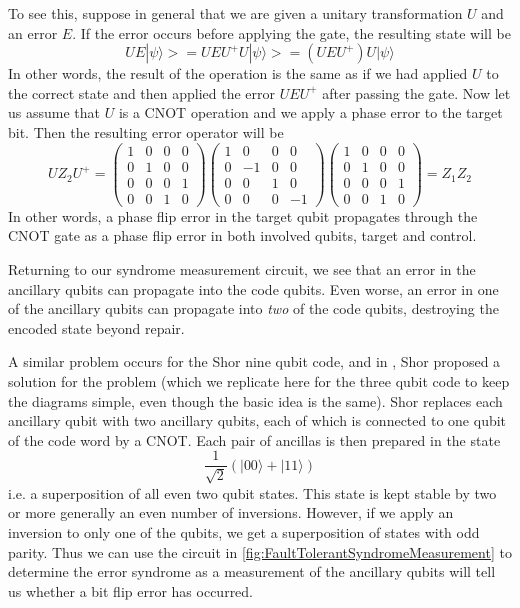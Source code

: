 \documentclass[a4paper, draft]{article}
\theoremstyle{own}
\theoremstyle{remark}
\begin{document}
To see this, suppose in general that we are given a unitary transformation $U$ and an error $E$. If the error occurs before applying the gate, the resulting state will be
$$
UE |\psi \rangle > = UEU^+ U |\psi \rangle > = (UEU^+) U |\psi \rangle
$$
In other words, the result of the operation is the same as if we had applied $U$ to the correct state and then applied the error $U E U^+$ after passing the gate. Now let us assume that $U$ is a CNOT operation and we apply a phase error to the target bit. Then the resulting error operator will be
$$
U Z_2 U^+ =
\begin{pmatrix} 1 & 0 & 0 & 0 \\ 0 & 1 & 0 & 0 \\ 0 & 0 & 0 & 1 \\ 0 & 0 & 1 & 0 \end{pmatrix} 
\begin{pmatrix} 1 & 0 & 0 & 0 \\ 0 & -1 & 0 & 0 \\ 0 & 0 & 1 & 0 \\ 0 & 0 & 0 & -1
\end{pmatrix} 
\begin{pmatrix} 1 & 0 & 0 & 0 \\ 0 & 1 & 0 & 0 \\ 0 & 0 & 0 & 1 \\ 0 & 0 & 1 & 0 \end{pmatrix} 
= Z_1 Z_2
$$
In other words, a phase flip error in the target qubit propagates through the CNOT gate as a phase flip error in both involved qubits, target and control. 

Returning to our syndrome measurement circuit, we see that an error in the ancillary qubits can propagate into the code qubits. Even worse, an error in one of the ancillary qubits can propagate into \emph{two} of the code qubits, destroying the encoded state beyond repair.

A similar problem occurs for the Shor nine qubit code, and in \cite{Shor96}, Shor proposed a solution for the problem (which we replicate here for the three qubit code to keep the diagrams simple, even though the basic idea is the same). Shor replaces each ancillary qubit with two ancillary qubits, each of which is connected to one qubit of the code word by a CNOT. Each pair of ancillas is then prepared in the state
$$
\frac{1}{\sqrt{2}} (|00 \rangle + |11 \rangle )
$$
i.e. a superposition of all even two qubit states. This state is kept stable by two or more generally an even number of inversions. However, if we apply an inversion to only one of the qubits, we get a superposition of states with odd parity. Thus we can use the circuit in \ref{fig:FaultTolerantSyndromeMeasurement} to determine the error syndrome as a measurement of the ancillary qubits will tell us whether a bit flip error has occurred.
\end{document}
